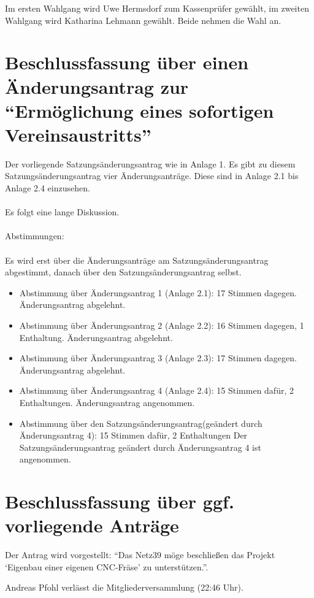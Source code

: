 \documentclass[a4paper,12pt,titlepage]{scrartcl}
\begin{document}
Im ersten Wahlgang wird Uwe Hermsdorf zum Kassenprüfer gewählt, im zweiten Wahlgang wird Katharina Lehmann gewählt.
Beide nehmen die Wahl an.

\section{Beschlussfassung über einen Änderungsantrag zur \enquote{Ermöglichung eines sofortigen Vereinsaustritts}} 

Der vorliegende Satzungsänderungsantrag wie in Anlage 1. Es gibt zu diesem Satzungsänderungsantrag vier Änderungsanträge. Diese sind in Anlage 2.1 bis Anlage 2.4 einzusehen. \\ \\
Es folgt eine lange Diskussion. \\ \\
Abstimmungen: \\ \\
Es wird erst über die Änderungsanträge am Satzungsänderungsantrag abgestimmt, danach über den Satzungsänderungsantrag selbst.
\begin{itemize}
	\item Abstimmung über Änderungsantrag 1 (Anlage 2.1): 17 Stimmen dagegen. Änderungsantrag abgelehnt.
	\item Abstimmung über Änderungsantrag 2 (Anlage 2.2): 16 Stimmen dagegen, 1 Enthaltung. Änderungsantrag abgelehnt.
	\item Abstimmung über Änderungsantrag 3 (Anlage 2.3): 17 Stimmen dagegen. Änderungsantrag abgelehnt.
	\item Abstimmung über Änderungsantrag 4 (Anlage 2.4): 15 Stimmen dafür, 2 Enthaltungen. Änderungsantrag angenommen.
	\item Abstimmung über den Satzungsänderungsantrag(geändert durch Änderungsantrag 4): 15 Stimmen dafür, 2 Enthaltungen Der Satzungsänderungsantrag geändert durch Änderungsantrag 4 ist angenommen.
\end{itemize}

\section{Beschlussfassung über ggf. vorliegende Anträge}

Der Antrag wird vorgestellt: \enquote{Das Netz39 möge beschließen das Projekt \enquote{Eigenbau einer eigenen CNC-Fräse} zu unterstützen.}.

Andreas Pfohl verlässt die Mitgliederversammlung (22:46 Uhr).
\end{document}
